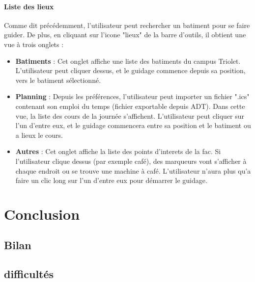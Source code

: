 \documentclass{article}
\begin{document}
	\paragraph{Liste des lieux}
	Comme dit précédemment, l'utilisateur peut rechercher un batiment pour se faire guider. De plus, en cliquant sur l'icone "lieux" de la barre d'outils, il obtient une vue à trois onglets : \\
	\begin{itemize}
		\item \textbf{Batiments} : Cet onglet affiche une liste des batiments du campus Triolet. L'utilisateur peut cliquer dessus, et le guidage commence depuis sa position, vers le batiment sélectionné.
		\item \textbf{Planning} : Depuis les préférences, l'utilisateur peut importer un fichier ".ics" contenant son emploi du temps (fichier exportable depuis ADT). Dans cette vue, la liste des cours de la journée s'affichent. L'utilisateur peut cliquer sur l'un d'entre eux, et le guidage commencera entre sa position et le batiment ou a lieux le cours.
		\item \textbf{Autres} : Cet onglet affiche la liste des points d'interets de la fac. Si l'utilisateur clique dessus (par exemple café), des marqueurs vont s'afficher à chaque endroit ou se trouve une machine à café. L'utilisateur n'aura plus qu'a faire un clic long sur l'un d'entre eux pour démarrer le guidage.
	\end{itemize}
	
	
	\section{Conclusion}
		\subsection{Bilan}
		\subsection{difficultés}
	
\end{document}
